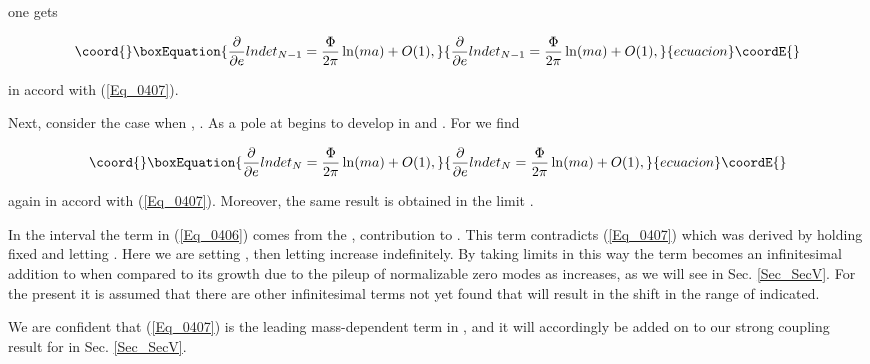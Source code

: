 \documentclass[a4paper,twocolumn,showpacs,preprintnumbers,amsmath,amssymb]{revtex4}
\providecommand{\pdo}[1]{\ensuremath{\frac{\partial }
        {\partial #1 }}}
\begin{document}
\noindent
one gets

\begin{equation}\coord{}\boxEquation{
\label{Eq_0410}
\pdo{e} lndet_{N-1} = \frac{\Phi}{2\pi} \ln(ma) + O(1),
}{
\pdo{e} lndet_{N-1} = \frac{\Phi}{2\pi} \ln(ma) + O(1),
}{ecuacion}\coordE{}\end{equation}

\noindent
in accord with (\ref{Eq_0407}).

Next, consider the case when \coordHE{},
\coordHE{}. As \coordHE{} a pole at \coordHE{} begins
to develop in \coordHE{} and
\coordHE{}. For \coordHE{} we
find

\begin{equation}\coord{}\boxEquation{
\label{Eq_0411}
\pdo{e} lndet_N = \frac{\Phi}{2\pi}\ln(ma) + O(1),
}{
\pdo{e} lndet_N = \frac{\Phi}{2\pi}\ln(ma) + O(1),
}{ecuacion}\coordE{}\end{equation}

\noindent
again in accord with (\ref{Eq_0407}). Moreover, the same result is
obtained in the limit \coordHE{}.

In the interval \coordHE{} the \coordHE{}
term in (\ref{Eq_0406}) comes from the \coordHE{}, \coordHE{} contribution to
\coordHE{}. This term contradicts (\ref{Eq_0407})
which was derived by holding \coordHE{} fixed and letting \coordHE{}. Here we are setting \coordHE{}, then letting \coordHE{} increase
indefinitely. By taking limits in this way the \coordHE{} term becomes
an infinitesimal addition to \coordHE{} when compared to its growth due
to the pileup of normalizable zero modes as \coordHE{} increases, as we
will see in Sec. \ref{Sec_SecV}. For the present it is assumed that
there are other infinitesimal terms not yet found that will result in
the shift \coordHE{} in the
range of \myHighlight{$\epsilon$}\coordHE{} indicated.

We are confident that (\ref{Eq_0407}) is the leading mass-dependent term
in \coordHE{}, and it will accordingly be added on to our strong coupling
result for \coordHE{} in Sec. \ref{Sec_SecV}.
\end{document}
